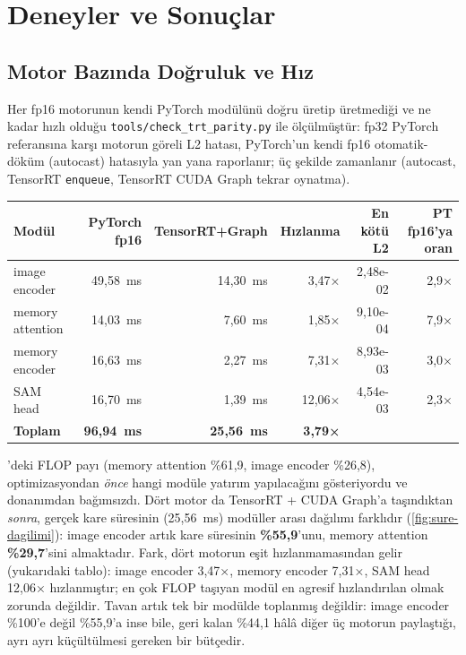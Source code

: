 \chapter{Deneyler ve Sonuçlar}
\label{ch:deneyler}

\section{Motor Bazında Doğruluk ve Hız}
\label{sec:motor-dogruluk-hiz}

Her fp16 motorunun kendi PyTorch modülünü doğru üretip üretmediği ve ne
kadar hızlı olduğu \texttt{tools/check\_trt\_parity.py} ile ölçülmüştür:
fp32 PyTorch referansına karşı motorun göreli L2 hatası, PyTorch'un
kendi fp16 otomatik-döküm (autocast) hatasıyla yan yana raporlanır; üç
şekilde zamanlanır (autocast, TensorRT \texttt{enqueue}, TensorRT CUDA
Graph tekrar oynatma).

\begin{olcum}[title={Ölçüldü (cihazda)}]
\begin{center}
\small
\begin{tabular}{lrrrrr}
  \toprule
  Modül & PyTorch fp16 & TensorRT+Graph & Hızlanma & En kötü L2 & PT fp16'ya oran \\
  \midrule
  image encoder & 49,58~ms & 14,30~ms & 3,47× & 2,48e-02 & 2,9× \\
  memory attention & 14,03~ms & 7,60~ms & 1,85× & 9,10e-04 & 7,9× \\
  memory encoder & 16,63~ms & 2,27~ms & 7,31× & 8,93e-03 & 3,0× \\
  SAM head & 16,70~ms & 1,39~ms & 12,06× & 4,54e-03 & 2,3× \\
  \midrule
  \textbf{Toplam} & \textbf{96,94~ms} & \textbf{25,56~ms} & \textbf{3,79×} & & \\
  \bottomrule
\end{tabular}
\end{center}
\end{olcum}

'deki FLOP payı (memory attention \%61,9, image
encoder \%26,8), optimizasyondan \emph{önce} hangi modüle yatırım
yapılacağını gösteriyordu ve donanımdan bağımsızdı. Dört motor da
TensorRT + CUDA Graph'a taşındıktan \emph{sonra}, gerçek kare süresinin
(25,56~ms) modüller arası dağılımı farklıdır (\cref{fig:sure-dagilimi}):
image encoder artık kare süresinin \textbf{\%55,9}'unu, memory
attention \textbf{\%29,7}'sini almaktadır. Fark, dört motorun eşit
hızlanmamasından gelir (yukarıdaki tablo): image encoder 3,47×, memory
encoder 7,31×, SAM head 12,06× hızlanmıştır; en çok FLOP taşıyan modül
en agresif hızlandırılan olmak zorunda değildir. Tavan artık tek bir
modülde toplanmış değildir: image encoder \%100'e değil \%55,9'a inse
bile, geri kalan \%44,1 hâlâ diğer üç motorun paylaştığı, ayrı ayrı
küçültülmesi gereken bir bütçedir.

